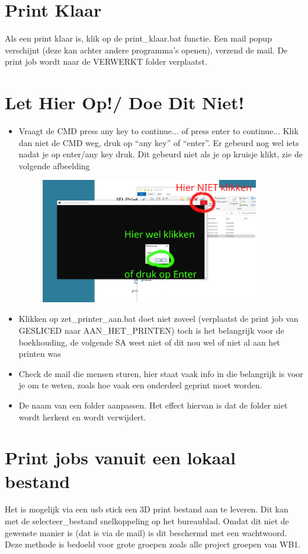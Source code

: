 \documentclass{article}
\newcommand{\quotes}[1]{``#1''}
\begin{document}
\section*{Print Klaar}
Als een print klaar is, klik op de print\_klaar.bat functie. Een mail popup verschijnt (deze kan achter andere programma's openen), verzend de mail. De print job wordt naar de VERWERKT folder verplaatst.

\section*{Let Hier Op!/ Doe Dit Niet!}
\begin{itemize}
  \item Vraagt de CMD press any key to continue... of press enter to continue... Klik dan niet de CMD weg, druk op \quotes{any key} of \quotes{enter}. Er gebeurd nog wel iets nadat je op enter/any key druk. Dit gebeurd niet als je op kruisje klikt, zie de volgende afbeelding
\begin{figure}[H]
    \centering
    \includegraphics[width=0.9\textwidth]{figures/donotclickcross}
\end{figure}
  \item Klikken op zet\_printer\_aan.bat doet niet zoveel (verplaatst de print job van GESLICED naar AAN\_HET\_PRINTEN) toch is het belangrijk voor de boekhouding, de volgende SA weet niet of dit nou wel of niet al aan het printen was
  \item Check de mail die mensen sturen, hier staat vaak info in die belangrijk is voor je om te weten, zoals hoe vaak een onderdeel geprint moet worden.
  \item De naam van een folder aanpassen. Het effect hiervan is dat de folder niet wordt herkent en wordt verwijdert.
\end{itemize}

\section*{Print jobs vanuit een lokaal bestand}
Het is mogelijk via een usb stick een 3D print bestand aan te leveren. Dit kan met de selecteer\_bestand snelkoppeling op het bureaublad. Omdat dit niet de gewenste manier is (dat is via de mail) is dit beschermd met een wachtwoord. Deze methode is bedoeld voor grote groepen zoals alle project groepen van WB1.
\end{document}
